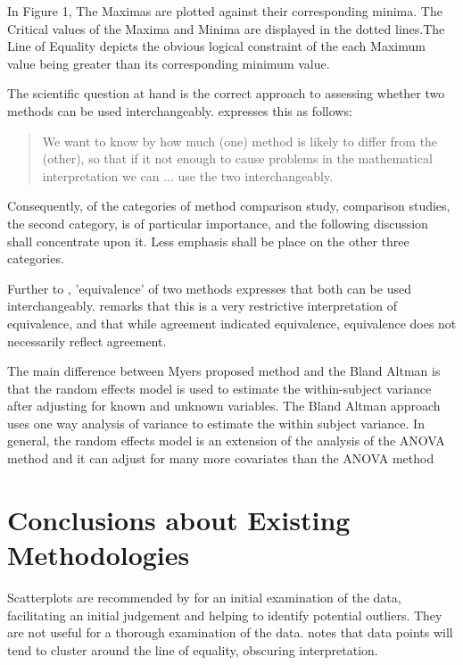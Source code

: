 \documentclass[12pt, a4paper]{report}
\begin{document}
In Figure 1,  The Maximas are plotted against their corresponding
minima. The Critical values of the Maxima and Minima are displayed
in the dotted lines.The Line of Equality depicts the obvious
logical constraint of the each Maximum value being greater than
its corresponding minimum value.



The scientific question at hand is the correct approach to
assessing whether two methods can be used interchangeably.
\citet{BA99} expresses this as follows:
\begin{quote}We want to
	know by how much (one) method is likely to differ from the
	(other), so that if it not enough to cause problems in the
	mathematical interpretation we can ... use the two
	interchangeably.
\end{quote}



Consequently, of the categories of method comparison study,
comparison studies, the second category, is of particular
importance, and the following discussion shall concentrate upon
it. Less emphasis shall be place on the other three categories.

\bigskip Further to \citet{BA86}, 'equivalence' of two methods expresses
that both can be used interchangeably.
\citet[p.49]{DunnSEME} remarks that this is a very restrictive
interpretation of equivalence, and that while agreement indicated
equivalence, equivalence does not necessarily reflect agreement.

The main difference between Myers proposed method and the Bland
Altman is that the random effects model is used to estimate the
within-subject variance after adjusting for known and unknown
variables. The Bland Altman approach uses one way analysis of
variance to estimate the within subject variance. In general, the
random effects model is an extension of the analysis of the ANOVA
method and it can adjust for many more covariates than the ANOVA
method






\newpage
\section{Conclusions about Existing Methodologies}

Scatterplots are recommended by \citet{BA83} for an initial
examination of the data, facilitating an initial judgement and
helping to identify potential outliers. They are not useful for a
thorough examination of the data. \citet{BritHypSoc} notes that
data points will tend to cluster around the line of equality,
obscuring interpretation.
\end{document}
